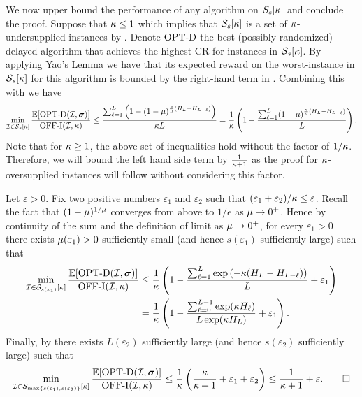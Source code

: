 
We now upper bound the performance of any algorithm on $S_s[\kappa]$ and conclude the proof. Suppose that
$\kappa \leq 1$ which implies that $\mathcal{S}_s[\kappa]$ is a set of $\kappa$-undersupplied instances by . Denote $\mathrm{OPT\textrm{-}D}$ the best (possibly randomized) delayed algorithm that achieves the highest CR for instances in $\mathcal{S}_s[\kappa]$. By applying Yao's Lemma we have that its expected reward on the worst-instance in $\mathcal{S}_s[\kappa]$ for this algorithm is bounded by the right-hand term in . Combining this with  we have
\begin{equation*}
    \min_{\mathcal I \in \mathcal{S}_s[\kappa]} \frac{\mathbb E[\mathrm{OPT\textrm{-}D}(\mathcal I, \bm{\sigma})]}{\mathrm{\mathrm{OFF}}\textrm{-}\mathrm{I}(\mathcal I,\kappa)} \leq \frac{\sum_{\ell=1}^L \left( 1 - (1-\mu)^{\frac{\kappa}{\mu} (H_L - H_{L-\ell})} \right)}{\kappa L} = \frac{1}{\kappa} \left( 1 - \frac{\sum_{\ell=1}^L  (1-\mu)^{\frac{\kappa}{\mu} (H_L - H_{L-\ell})}}{L} \right).
\end{equation*}
Note that for $\kappa \geq 1$, the above set of inequalities hold without the factor of $1/\kappa$. Therefore, we will bound the left hand side term by $\frac{1}{\kappa + 1}$ as the proof for $\kappa$-oversupplied instances will follow without considering this factor.

Let $\varepsilon >0$. Fix two positive numbers $\varepsilon_1$ and $\varepsilon_2$ such that $(\varepsilon_1 + \varepsilon_2)/\kappa \leq \varepsilon$. Recall the fact that $(1-\mu)^{1/\mu}$ converges from above to $1/e$ as $\mu \rightarrow 0^+$. Hence by continuity of the sum and the definition of limit as $\mu \xrightarrow[]{} 0^+$, for every $\varepsilon_1 > 0$ there exists $\mu(\varepsilon_1)>0$ sufficiently small (and hence $s(\varepsilon_1)$ sufficiently large) such that
    \begin{align*}
         \min_{\mathcal I \in \mathcal{S}_{s(\varepsilon_1)}[\kappa]} \frac{\mathbb E[\mathrm{OPT\textrm{-}D}(\mathcal I, \bm{\sigma})]}{\mathrm{\mathrm{OFF}}\textrm{-}\mathrm{I}(\mathcal I,\kappa)} 
        &\leq \frac{1}{\kappa} \left( 1-\frac{\sum_{\ell=1}^L  \exp \left( - \kappa(H_L - H_{L-\ell}) \right)}{L} + \varepsilon_1 \right)\\
        &= \frac{1}{\kappa} \left( 1-\frac{\sum_{\ell=0}^{L-1} \exp(\kappa H_{\ell})}{L \exp( \kappa H_L)} + \varepsilon_1 \right).
    \end{align*}
    Finally, by  there exists $L(\varepsilon_2)$ sufficiently large (and hence $s(\varepsilon_2)$ sufficiently large) such that
    \begin{equation*}
        \label{ineq: k/k+1 + eps}
        \min_{\inst \in \mathcal{S}_{\max\{s(\varepsilon_1), s(\varepsilon_2) \}}[\market]} \frac{\mathbb E[\optD(\inst, \sigmabf)]}{\offI(\inst,\kappa)}  \leq \frac{1}{\market} \left( \frac{\market}{\market+1} + \varepsilon_1 + \varepsilon_2 \right)\leq \frac{1}{\market+1} + \varepsilon.\hfill\Halmos
    \end{equation*}

